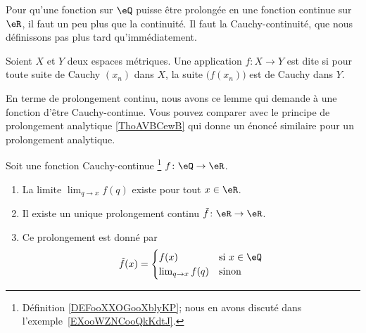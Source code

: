 Pour qu'une fonction sur \( \eQ\) puisse être prolongée en une fonction continue sur \( \eR\), il faut un peu plus que la continuité. Il faut la Cauchy-continuité, que nous définissons pas plus tard qu'immédiatement.

\begin{definition}      \label{DEFooXXOGooXblyKP}
	Soient \( X\) et \( Y\) deux espaces métriques. Une application \( f\colon X\to Y\) est dite  si pour toute suite de Cauchy \( (x_n)\) dans \( X\), la suite \( \big( f(x_n) \big)\) est de Cauchy dans \( Y\).
\end{definition}

En terme de prolongement continu, nous avons ce lemme qui demande à une fonction d'être Cauchy-continue. Vous pouvez comparer avec le principe de prolongement analytique \ref{ThoAVBCewB} qui donne un énoncé similaire pour un prolongement analytique.
\begin{lemma}           \label{LEMooUAFBooAwiXxj}
	Soit une fonction Cauchy-continue \footnote{Définition \ref{DEFooXXOGooXblyKP}; nous en avons discuté dans l'exemple~\ref{EXooWZNCooQkKdtJ}.} \( f\colon \eQ\to \eR\).
	\begin{enumerate}
		\item
		      La limite \( \lim_{q\to x} f(q)\) existe pour tout \( x\in \eR\).
		\item
		      Il existe un unique prolongement continu \( \tilde f\colon \eR\to \eR\).
		\item
		      Ce prolongement est donné par
		      \begin{equation}
			      \tilde f(x)=\begin{cases}
				      f(x)               & \text{si } x\in \eQ \\
				      \lim_{q\to x} f(q) & \text{sinon }
			      \end{cases}
		      \end{equation}
	\end{enumerate}
\end{lemma}

